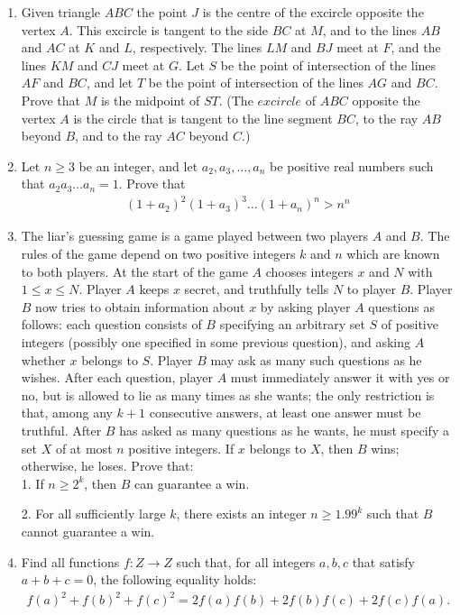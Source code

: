 \documentclass{article}
\begin{document}
\begin{enumerate}
\item Given triangle $ABC$ the point $J$ is the centre of the excircle opposite the vertex $A$. This excircle is tangent to the side $BC$ at $M$, and to the lines $AB$ and $AC$ at $K$ and $L$, respectively. The lines $LM$ and $BJ$ meet at $F$, and the lines $KM$ and $CJ$ meet at $G$. Let $S$ be the point of intersection of the lines $AF$ and $BC$, and let $T$ be the point of intersection of the lines $AG$ and $BC$. Prove that $M$ is the midpoint of $ST$.
(The $excircle$ of $ABC$ opposite the vertex $A$ is the circle that is tangent to the line segment $BC$, to the ray $AB$ beyond $B$, and to the ray $AC$ beyond $C$.)
\item  Let $n\geq{3}$ be an integer, and let $a_{2}, a_{3},\dots, a_{n}$  be positive real numbers such that $a_{2}a_{3} \dots a_{n}=1$. Prove that
	\begin{align}
		(1+a_{2}) ^{2}  (1+a_{3}) ^{3} \dots (1+a_{n}) ^{n} > n^{n}
	\end{align}
	
\item The liar's guessing game is a game played between two players $A$ and $B$. The rules of the game depend on two positive integers $k$ and $n$ which are known to both players. At the start of the game $A$ chooses integers $x$ and $N$ with $1\leq{x}\leq{N}$. Player $A$ keeps $x$ secret, and truthfully tells $N$ to player $B$. Player $B$ now tries to obtain information about $x$ by asking player $A$ questions as follows: each question consists of $B$ specifying an arbitrary set $S$ of positive integers (possibly one specified in some previous question), and asking $A$ whether $x$ belongs to $S$. Player $B$ may ask as many such questions as he wishes. After each question, player $A$ must immediately answer it with yes or no, but is allowed to lie as many times as she wants; the only restriction is that, among any $k + 1$ consecutive answers, at least one answer must be truthful.
	After $B$ has asked as many questions as he wants, he must specify a set $X$ of at most $n$ positive integers. If $x$ belongs to $X$, then $B$ wins; otherwise, he loses. Prove that: \\
1. If $n\geq{2^{k}}$, then $B$ can guarantee a win.

		2. For all sufficiently large $k$, there exists an integer $n\geq{1.99^{k}}$ such that $B$ cannot guarantee a win.
	\item Find all functions $f:Z \rightarrow Z $  such that, for all integers $a, b, c$ that satisfy $a+b+c = 0$, the following equality holds:
		\begin{align}
			f(a)^2+f(b)^2+f(c)^2=2f(a)f(b)+2f(b)f(c)+2f(c)f(a).
		\end{align}
		

\end{enumerate}
\end{document}
